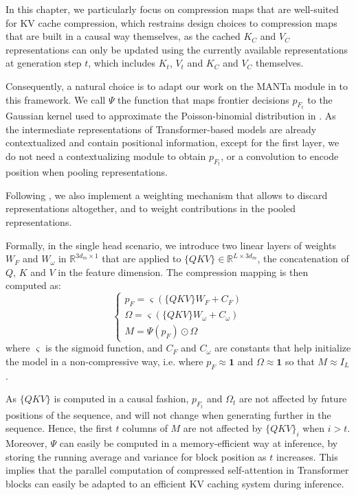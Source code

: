 In this chapter, we particularly focus on compression maps that are well-suited for KV cache compression, which restrains design choices to compression maps that are built in a causal way themselves, as the cached $K_C$ and $V_C$ representations can only be updated using the currently available representations at generation step $t$, which includes $K_t$, $V_t$ and $K_C$ and $V_C$ themselves.

Consequently, a natural choice is to adapt our work on the MANTa module in  to this framework. We call $\Psi$ the function that maps frontier decisions $p_{F_t}$ to the Gaussian kernel used to approximate the Poisson-binomial distribution in . As the intermediate representations of Transformer-based models are already contextualized and contain positional information, except for the first layer, we do not need a contextualizing module to obtain $p_{F_t}$, or a convolution to encode position when pooling representations. 

Following \citet{nawrot2024dynamic}, we also implement a weighting mechanism that allows to discard representations altogether, and to weight contributions in the pooled representations. 

Formally, in the single head scenario, we introduce two linear layers of weights $W_F$ and $W_\omega$ in $\mathbb{R}^{3d_m \times 1}$ that are applied to $\{QKV\} \in \mathbb{R}^{L \times 3d_m}$, the concatenation of $Q$, $K$ and $V$ in the feature dimension. The compression mapping is then computed as:
\begin{equation}
    \begin{cases}
        p_F = \varsigma \left(\{QKV\} W_F + C_F\right) \\
        \Omega = \varsigma \left(\{QKV\} W_\omega + C_\omega\right) \\
        M = \Psi(p_F) \odot \Omega
    \end{cases}
\end{equation}
where $\varsigma$ is the sigmoid function, and $C_F$ and $C_\omega$ are constants that help initialize the model in a non-compressive way, i.e. where $p_F \approx\mathbf{1}$ and $\Omega \approx\mathbf{1}$ so that $M \approx I_L$.

As $\{QKV\}$ is computed in a causal fashion, $p_{F_t}$ and $\Omega_t$ are not affected by future positions of the sequence, and will not change when generating further in the sequence. Hence, the first $t$ columns of $M$ are not affected by $\{QKV\}_i$ when $i > t$. Moreover, $\Psi$ can easily be computed in a memory-efficient way at inference, by storing the running average and variance for block position as $t$ increases. This implies that the parallel computation of compressed self-attention in Transformer blocks can easily be adapted to an efficient KV caching system during inference.

